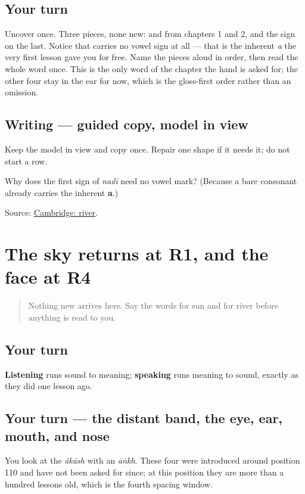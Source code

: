 \subsection*{Your turn}
Uncover \textbf{} once. Three pieces, none new: \textbf{} and \textbf{} from chapters 1 and 2, and the \textbf{} sign on the last. Notice that \textbf{} carries no vowel sign at all — that is the inherent \emph{a} the very first lesson gave you for free. Name the pieces aloud in order, then read the whole word once. This is the only word of the chapter the hand is asked for; the other four stay in the ear for now, which is the gloss-first order rather than an omission.

\subsection*{Writing — guided copy, model in view}
Keep the model in view and copy \textbf{} once. Repair one shape if it needs it; do not start a row.

\begin{tcolorbox}[breakable,colback=teal!4,colframe=teal!35!black,title={Before you move on}]
Why does the first sign of \emph{nadī} need no vowel mark? (Because a bare consonant already carries the inherent \textbf{a}.)

Source: \href{https://dictionary.cambridge.org/dictionary/english-gujarati/river}{Cambridge: river}.
\end{tcolorbox}
\section[Practice]{The sky returns at R1, and the face at R4}

\label{lesson:GU-R29-sky-five-r1}



\begin{quote}
Nothing new arrives here. Say the words for sun and for river before anything is read to you.
\end{quote}

\subsection*{Your turn}
\textbf{Listening} runs sound to meaning; \textbf{speaking} runs meaning to sound, exactly as they did one lesson ago.

\subsection*{Your turn — the distant band, the eye, ear, mouth, and nose}
You look at the \emph{ākāsh} with an \emph{āṅkh}. These four were introduced around position 110 and have not been asked for since; at this position they are more than a hundred lessons old, which is the fourth spacing window.

